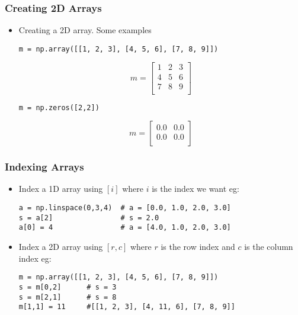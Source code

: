 \documentclass[english,14pt]{beamer}
\begin{document}
\begin{frame}[fragile]
\frametitle{ Creating 2D Arrays}
	\begin{itemize}
		\item  Creating a 2D array. Some examples 
\begin{lstlisting}[style=CStyle]
m = np.array([[1, 2, 3], [4, 5, 6], [7, 8, 9]])
\end{lstlisting}

\[		
m = \left[ 
\begin{array}{ccc}
     1 & 2 & 3   \\
     4 & 5 & 6   \\
     7 & 8 & 9  \\     
\end{array} \right]  
\]
\begin{lstlisting}[style=CStyle]
m = np.zeros([2,2])
\end{lstlisting}
\[		
m = \left[ 
\begin{array}{cc}
    0.0 & 0.0   \\
    0.0 & 0.0   \\
\end{array} \right]  
\]
	\end{itemize}
\end{frame}

\begin{frame}[fragile]
\frametitle{Indexing Arrays}
	\begin{itemize}
		\item Index a 1D array using $[i]$ where $i$ is the index we want eg: 
\begin{lstlisting}[style=CStyle]
a = np.linspace(0,3,4)  # a = [0.0, 1.0, 2.0, 3.0] 
s = a[2]                # s = 2.0
a[0] = 4                # a = [4.0, 1.0, 2.0, 3.0] 
\end{lstlisting}
		\item Index a 2D array using $[r,c]$ where $r$ is the row index and $c$ is the column index eg: 
\begin{lstlisting}[style=CStyle]		
m = np.array([[1, 2, 3], [4, 5, 6], [7, 8, 9]])
s = m[0,2]      # s = 3
s = m[2,1]      # s = 8
m[1,1] = 11     #[[1, 2, 3], [4, 11, 6], [7, 8, 9]]
\end{lstlisting}		
	\end{itemize}
\end{frame}
\end{document}
